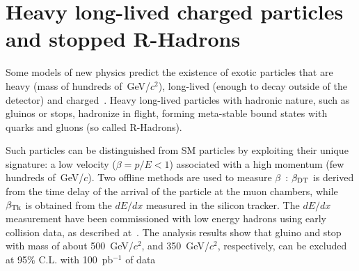 \documentclass{cmspaper}
\begin{document}
\section{Heavy long-lived charged particles and stopped R-Hadrons} \label{HSCP}
Some models of new physics predict the existence 
of exotic particles that are heavy (mass of hundreds of~GeV/$c^2$), 
long-lived (enough to decay outside of the detector) and charged~\cite{Fairbairn:2006gg}. 
Heavy long-lived particles with hadronic nature, such as gluinos or stops, 
hadronize in flight, forming meta-stable bound states with quarks and gluons (so called R-Hadrons).

Such particles can be distinguished from SM particles
by exploiting their unique signature: a low velocity ($\beta=p/E<1$) 
associated with a high momentum (few hundreds of~GeV/$c$).
Two offline methods are used to measure $\beta$~\cite{HSCP}:
$\beta_{{\rm DT}}$ is derived from the time delay of the arrival of the particle
at the muon chambers, while $\beta_{{\rm Tk}}$ is obtained from the $dE/dx$ 
measured in the silicon tracker.
The $dE/dx$ measurement have been commissioned with low energy hadrons 
using early collision data, as described at~\cite{TRACKERPAS}.
The analysis results show that gluino and stop 
with mass of about 500~GeV/$c^2$, and 350~GeV/$c^2$, 
respectively, can be excluded at 95\% C.L. with 100~pb$^{-1}$ of data
\end{document}
